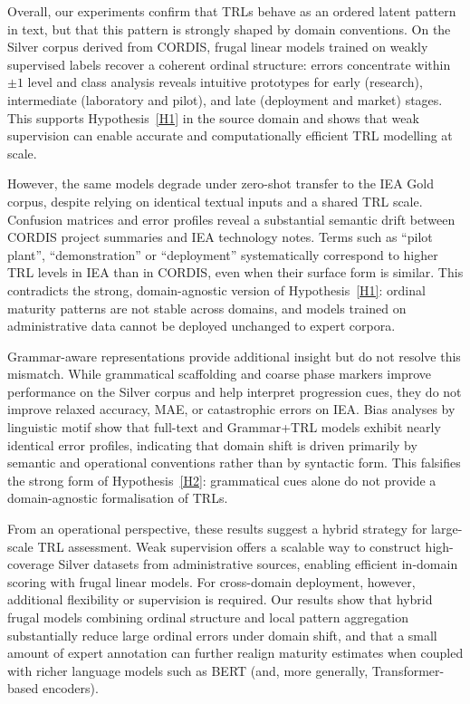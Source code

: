 \documentclass[runningheads]{llncs}
\begin{document}
Overall, our experiments confirm that TRLs behave as an ordered latent pattern in text, but that this pattern is strongly shaped by domain conventions. On the Silver corpus derived from CORDIS, frugal linear models trained on weakly supervised labels recover a coherent ordinal structure: errors concentrate within $\pm 1$ level and class analysis reveals intuitive prototypes for early (research), intermediate (laboratory and pilot), and late (deployment and market) stages. This supports Hypothesis~\ref{H1} in the source domain and shows that weak supervision can enable accurate and computationally efficient TRL modelling at scale.

However, the same models degrade under zero-shot transfer to the IEA Gold corpus, despite relying on identical textual inputs and a shared TRL scale. Confusion matrices and error profiles reveal a substantial semantic drift between CORDIS project summaries and IEA technology notes. Terms such as ``pilot plant'', ``demonstration'' or ``deployment'' systematically correspond to higher TRL levels in IEA than in CORDIS, even when their surface form is similar. This contradicts the strong, domain-agnostic version of Hypothesis~\ref{H1}: ordinal maturity patterns are not stable across domains, and models trained on administrative data cannot be deployed unchanged to expert corpora.

Grammar-aware representations provide additional insight but do not resolve this mismatch. While grammatical scaffolding and coarse phase markers improve performance on the Silver corpus and help interpret progression cues, they do not improve relaxed accuracy, MAE, or catastrophic errors on IEA. Bias analyses by linguistic motif show that full-text and Grammar+TRL models exhibit nearly identical error profiles, indicating that domain shift is driven primarily by semantic and operational conventions rather than by syntactic form. This falsifies the strong form of Hypothesis~\ref{H2}: grammatical cues alone do not provide a domain-agnostic formalisation of TRLs.

From an operational perspective, these results suggest a hybrid strategy for large-scale TRL assessment. Weak supervision offers a scalable way to construct high-coverage Silver datasets from administrative sources, enabling efficient in-domain scoring with frugal linear models. For cross-domain deployment, however, additional flexibility or supervision is required. Our results show that hybrid frugal models combining ordinal structure and local pattern aggregation substantially reduce large ordinal errors under domain shift, and that a small amount of expert annotation can further realign maturity estimates when coupled with richer language models such as BERT (and, more generally, Transformer-based encoders). 
\color{red}
\end{document}
